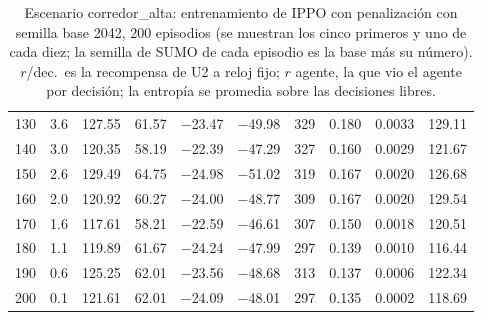 \begin{table}[H]
\begin{tabular}{rrrrrrrrrr}
130 & 3.6 & 127.55 & 61.57 & $-$23.47 & $-$49.98 & 329 & 0.180 & 0.0033 & 129.11 \\
140 & 3.0 & 120.35 & 58.19 & $-$22.39 & $-$47.29 & 327 & 0.160 & 0.0029 & 121.67 \\
150 & 2.6 & 129.49 & 64.75 & $-$24.98 & $-$51.02 & 319 & 0.167 & 0.0020 & 126.68 \\
160 & 2.0 & 120.92 & 60.27 & $-$24.00 & $-$48.77 & 309 & 0.167 & 0.0020 & 129.54 \\
170 & 1.6 & 117.61 & 58.21 & $-$22.59 & $-$46.61 & 307 & 0.150 & 0.0018 & 120.51 \\
180 & 1.1 & 119.89 & 61.67 & $-$24.24 & $-$47.99 & 297 & 0.139 & 0.0010 & 116.44 \\
190 & 0.6 & 125.25 & 62.01 & $-$23.56 & $-$48.68 & 313 & 0.137 & 0.0006 & 122.34 \\
200 & 0.1 & 121.61 & 62.01 & $-$24.09 & $-$48.01 & 297 & 0.135 & 0.0002 & 118.69 \\
\bottomrule
\end{tabular}
\caption[Escenario corredor\_alta: entrenamiento de IPPO con penalización, semilla base 2042]{Escenario corredor\_alta: entrenamiento de IPPO con penalización con semilla base 2042, 200 episodios (se muestran los cinco primeros y uno de cada diez; la semilla de SUMO de cada episodio es la base más su número). $r$/dec.\ es la recompensa de U2 a reloj fijo; $r$ agente, la que vio el agente por decisión; la entropía se promedia sobre las decisiones libres.}
\label{tab:corredor_alta-ippo-spill-2042}
\end{table}

